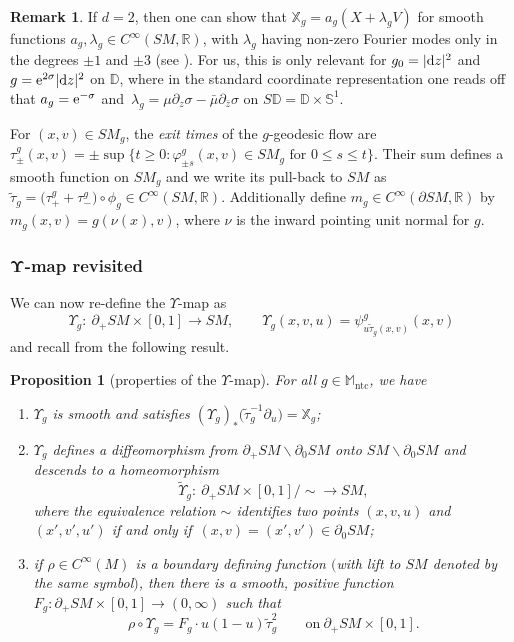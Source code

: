 \documentclass[10pt,a4paper]{amsart}
\numberwithin{equation}{section}
\newtheorem{Proposition}[Theorem]{Proposition}
\theoremstyle{definition}
\newtheorem{Remark}[Theorem]{Remark}
\newcommand{\R}{\mathbb{R}} %
\newcommand{\DD}{\mathbb{D}} %
\newcommand{\M}{\mathbb{M}}
\newcommand{\1}{{\bf 1}}
\newcommand{\ntc}{\mathrm{ntc}}
\begin{document}
\begin{Remark}\label{rmk_xpres}
If $d=2$, then one can show that $\mathbb X_g = a_g(X+\lambda_g V)$ for smooth functions $a_g,\lambda_g\in C^\infty(SM,\R)$, with $\lambda_g$ having non-zero Fourier modes only in the degrees $\pm 1$ and $\pm 3$ (see \cite[Section 3.1]{MePa20}). For us, this is only relevant for $g_0=|{\rm d}z|^2$ and $g={\rm e}^{2\sigma}|{\rm d}z|^2$ on $\DD$, where in the standard coordinate representation \cite[Lemma~3.5.6]{PSU23} one reads off that $a_g = {\rm e}^{-\sigma}$ and~${\lambda_g= \mu \partial_z \sigma - \bar \mu \partial_{\bar z}\sigma}$ on $S\DD = \DD\times \mathbb S^1$.
\end{Remark}

For $(x,v)\in SM_g$, the {\it exit times} of the $g$-geodesic flow are $\tau_\pm^g(x,v)=\pm \sup\{t\ge 0: \varphi^g_{\pm s}(x,v)\in SM_g \text{ for } 0\le s \le t\}$. Their sum defines a smooth function on $SM_g$ and we write its pull-back to $SM$ as
$\tilde \tau_g = \bigl(\tau_+^g+\tau_-^g\bigr)\circ \phi_g \in C^\infty(SM,\R)$.
Additionally define $m_g\in C^\infty(\partial SM,\R)$ by~${m_g(x,v)=g(\nu(x),v)}$, where $\nu$ is the inward pointing unit normal for $g$.

\subsubsection[Upsilon-map revisited]{$\boldsymbol{\Upsilon}$-map revisited}We can now re-define the $\Upsilon$-map as
\[
	\Upsilon_g\colon \ \partial_+SM \times [0,1]\rightarrow SM,\qquad \Upsilon_g(x,v,u)=\psi^g_{u\tilde\tau_g(x,v)}(x,v)
\]
and recall from \cite{MNP20} the following result.

\begin{Proposition}[properties of the $\Upsilon$-map]\label{propups} For all $g\in \M_\ntc$, we have
	\begin{enumerate}[label=\rm (\roman*)]\itemsep=0pt
	\item $\Upsilon_g$ is smooth and satisfies $(\Upsilon_g)_*\bigl(\tilde\tau_g^{-1}\partial_u\bigr) = \mathbb X_g$;
	
	\item $\Upsilon_g$ defines a diffeomorphism from $\partial_+SM\backslash \partial_0SM$ onto $SM\backslash \partial_0SM$ and descends to a homeomorphism
	\[
		\tilde \Upsilon_g\colon\ \partial_+SM\times [0,1]/{\sim} \rightarrow SM,
	\]
	where the equivalence relation $\sim$ identifies two points $(x,v,u)$ and $(x',v',u')$ if and only if~${(x,v)=(x',v')\in \partial_0SM}$;
	
	\item if $\rho\in C^\infty(M)$ is a boundary defining function $($with lift to $SM$ denoted by the same symbol$)$, then there is a smooth, positive function $F_g\colon \partial_+SM\times [0,1]\rightarrow (0,\infty)$ such that
	\[
	\rho \circ\Upsilon_g =F_g
	\cdot u(1-u)\tilde \tau_g^2\qquad \text{on} \  \partial_+SM\times [0,1].
	\]
	\end{enumerate}
\end{Proposition}
\end{document}
